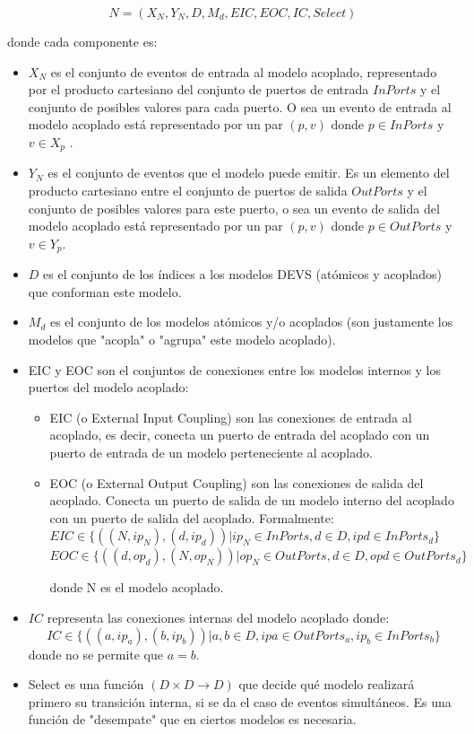 \documentclass[a4paper,	11pt]{report}
\begin{document}
\begin{equation}
N = (X_N , Y_N , D, {M_d }, EIC, EOC, IC, Select)
\end{equation}

donde cada componente es:
\begin{itemize}
\item $X_N$ es el conjunto de eventos de entrada al modelo acoplado, representado por el producto cartesiano del conjunto de puertos de entrada $InPorts$ y el conjunto de posibles valores para cada puerto. O sea un evento de entrada al modelo acoplado está representado por un par $(p, v)$ donde $p \in InPorts$ y $v \in X_p$ .

\item $Y_N$ es el conjunto de eventos que el modelo puede emitir. Es un elemento del producto cartesiano entre el conjunto de puertos de salida $OutPorts$ y el conjunto de posibles valores para este puerto, o sea un evento de salida del modelo acoplado está representado por un par $(p, v)$ donde $p \in OutPorts$ y $v \in Y_p$.

\item $D$ es el conjunto de los índices a los modelos DEVS (atómicos y acoplados) que conforman este modelo. 

\item ${M_d}$ es el conjunto de los modelos atómicos y/o acoplados (son justamente los modelos que "acopla" o "agrupa" este modelo acoplado).

\item EIC y EOC son el conjuntos de conexiones entre los modelos internos y los puertos del modelo acoplado:
      \begin {itemize}
          \item EIC (o External Input Coupling) son las conexiones de entrada al acoplado, es decir, conecta un puerto de entrada del acoplado con un puerto de entrada de un modelo perteneciente al acoplado.
          \item EOC (o External Output Coupling) son las conexiones de salida del acoplado. Conecta un puerto de salida de un modelo interno del acoplado con un puerto de salida del acoplado. Formalmente:
          $ EIC \in \{((N, ip_N ), (d, ip_d )) | ip_N \in InPorts, d \in D, ip d \in InPorts_d \} $
          $EOC \in \{((d, op_d ), (N, op_N ))  | op_N \in OutPorts, d \in D, op d \in OutPorts_d \} $
    
    	donde N es el modelo acoplado.
      \end{itemize}

\item $IC$ representa las conexiones internas del modelo acoplado donde:
\begin{equation}
IC \in \{((a, ip_a ), (b, ip_b )) | a, b \in D, ip a \in OutPorts_a , ip_b \in InPorts_b \}
\end{equation}
donde no se permite que $a = b$.

\item Select es una función $(D \times D \to D)$ que decide qué modelo realizará primero su transición interna, si se da el caso de eventos simultáneos. Es una función de "desempate" que en ciertos modelos es necesaria.
\end{itemize}
\end{document}
